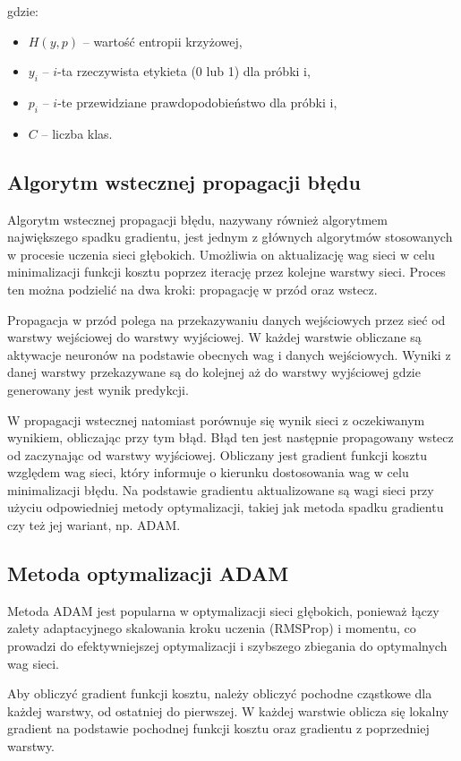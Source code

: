 \documentclass{article}
\begin{document}
gdzie:
\begin{itemize}
    \item  \(H(y, p)\) -- wartość entropii krzyżowej,
    \item  \(y_i\) -- \(i\)-ta rzeczywista etykieta (0 lub 1) dla próbki i,
    \item  \(p_i\) -- \(i\)-te przewidziane prawdopodobieństwo dla próbki i,
    \item \(C\) -- liczba klas.
\end{itemize}

\subsection{Algorytm wstecznej propagacji błędu}
Algorytm wstecznej propagacji błędu, nazywany również algorytmem największego spadku gradientu, jest jednym z głównych algorytmów stosowanych w procesie uczenia sieci głębokich.
Umożliwia on aktualizację wag sieci w celu minimalizacji funkcji kosztu poprzez iterację przez kolejne warstwy sieci.
Proces ten można podzielić na dwa kroki: propagację w przód oraz wstecz.

Propagacja w przód polega na przekazywaniu danych wejściowych przez sieć od warstwy wejściowej do warstwy wyjściowej.
W każdej warstwie obliczane są aktywacje neuronów na podstawie obecnych wag i danych wejściowych.
Wyniki z danej warstwy przekazywane są do kolejnej aż do warstwy wyjściowej gdzie generowany jest wynik predykcji.

W propagacji wstecznej natomiast porównuje się wynik sieci z oczekiwanym wynikiem, obliczając przy tym błąd.
Błąd ten jest następnie propagowany wstecz od zaczynając od warstwy wyjściowej.
Obliczany jest gradient funkcji kosztu względem wag sieci, który informuje o kierunku dostosowania wag w celu minimalizacji błędu.
Na podstawie gradientu aktualizowane są wagi sieci przy użyciu odpowiedniej metody optymalizacji, takiej jak metoda spadku gradientu czy też jej wariant, np. ADAM.

\subsection{Metoda optymalizacji ADAM}
Metoda ADAM jest popularna w optymalizacji sieci głębokich, ponieważ łączy zalety adaptacyjnego skalowania kroku uczenia (RMSProp) i momentu, co prowadzi do efektywniejszej optymalizacji i szybszego zbiegania do optymalnych wag sieci.

Aby obliczyć gradient funkcji kosztu, należy obliczyć pochodne cząstkowe dla każdej warstwy, od ostatniej do pierwszej.
W każdej warstwie oblicza się lokalny gradient na podstawie pochodnej funkcji kosztu oraz gradientu z poprzedniej warstwy.
\end{document}
